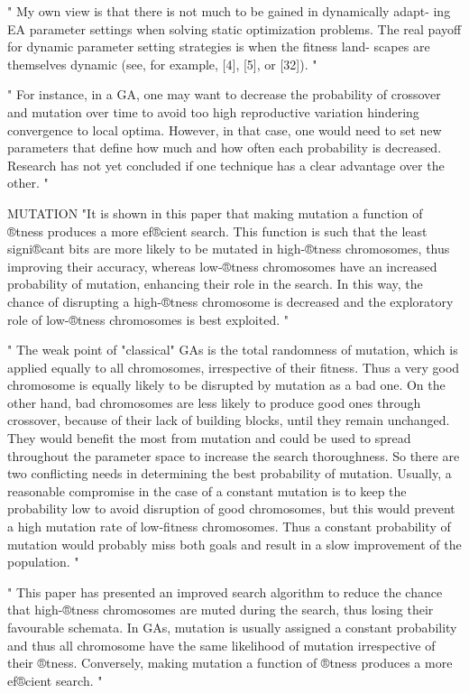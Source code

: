 "
My own view is that there is not much to be gained in dynamically adapt- ing EA parameter settings when solving static optimization problems. The real payoff for dynamic parameter setting strategies is when the fitness land- scapes are themselves dynamic (see, for example, [4], [5], or [32]).
"\cite{kacprzyk_parameter_2007}

"
For instance, in a GA, one may want to decrease the probability of crossover and mutation over time to avoid too high reproductive variation hindering convergence to local optima. However, in that case, one would need to set new parameters that define how much and how often each probability is decreased. Research has not yet concluded if one technique has a clear advantage over the other.
"\cite{klampfl_using_nodate}


MUTATION
"It is shown in this paper that making mutation a function of ®tness produces a more ef®cient search. This function is such that the least signi®cant bits are more likely to be mutated in high-®tness chromosomes, thus improving their accuracy, whereas low-®tness chromosomes have an increased probability of mutation, enhancing their role in the search. In this way, the chance of disrupting a high-®tness chromosome is decreased and the exploratory role of low-®tness chromosomes is best exploited.
"
\cite{marsili_libelli_adaptive_2000}

"
The weak point of "classical" GAs is the total randomness of mutation, which is applied equally to all chromosomes, irrespective of their fitness. Thus a very good chromosome is equally likely to be disrupted by mutation as a bad one. On the other hand, bad chromosomes are less likely to produce good ones through crossover, because of their lack of building blocks, until they remain unchanged. They would benefit the most from mutation and could be used to spread throughout the parameter space to increase the search thoroughness. So there are two conflicting needs in determining the best probability of mutation. Usually, a reasonable compromise in the case of a constant mutation is to keep the probability low to avoid disruption of good chromosomes, but this would prevent a high mutation rate of low-fitness chromosomes. Thus a constant probability of mutation would probably miss both goals and result in a slow improvement of the population.
"\cite{marsili_libelli_adaptive_2000}


"
This paper has presented an improved search algorithm to reduce the chance that high-®tness chromosomes are muted during the search, thus losing their favourable schemata. In GAs, mutation is usually assigned a constant probability and thus all chromosome have the same likelihood of mutation irrespective of their ®tness. Conversely, making mutation a function of ®tness produces a more ef®cient search.
"\cite{marsili_libelli_adaptive_2000}

